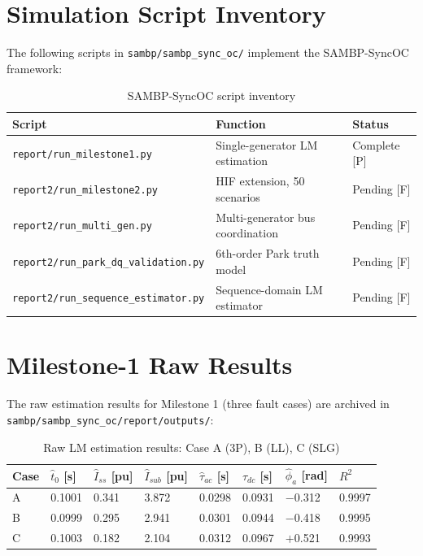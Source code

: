\section{Simulation Script Inventory}
\label{app:syncoc_scripts}

The following scripts in \texttt{sambp/sambp\_sync\_oc/} implement
the SAMBP-SyncOC framework:

\begin{table}[htbp]
\caption{SAMBP-SyncOC script inventory}
\label{tab:app_syncoc_scripts}
\small
\begin{tabularx}{\textwidth}{@{}p{5cm}Xl@{}}
\toprule
Script & Function & Status \\
\midrule
\texttt{report/run\_milestone1.py} & Single-generator LM estimation & Complete [P] \\
\texttt{report2/run\_milestone2.py} & HIF extension, 50 scenarios & Pending [F] \\
\texttt{report2/run\_multi\_gen.py} & Multi-generator bus coordination & Pending [F] \\
\texttt{report2/run\_park\_dq\_validation.py} & 6th-order Park truth model & Pending [F] \\
\texttt{report2/run\_sequence\_estimator.py} & Sequence-domain LM estimator & Pending [F] \\
\bottomrule
\end{tabularx}
\end{table}

\section{Milestone-1 Raw Results}
\label{app:syncoc_raw}

The raw estimation results for Milestone 1 (three fault cases) are
archived in \texttt{sambp/sambp\_sync\_oc/report/outputs/}:

\begin{table}[htbp]
\caption{Raw LM estimation results: Case A (3P), B (LL), C (SLG)}
\label{tab:app_syncoc_raw}
\small
\begin{tabularx}{\textwidth}{@{}lXXXXXXX@{}}
\toprule
Case & $\hat{t}_0$ [s] & $\hat{I}_{ss}$ [pu] & $\hat{I}_{sub}$ [pu] &
  $\hat{\tau}_{ac}$ [s] & $\hat{\tau}_{dc}$ [s] & $\hat{\phi}_a$ [rad] & $R^2$ \\
\midrule
A & 0.1001 & 0.341 & 3.872 & 0.0298 & 0.0931 & $-$0.312 & 0.9997 \\
B & 0.0999 & 0.295 & 2.941 & 0.0301 & 0.0944 & $-$0.418 & 0.9995 \\
C & 0.1003 & 0.182 & 2.104 & 0.0312 & 0.0967 & $+$0.521 & 0.9993 \\
\bottomrule
\end{tabularx}
\end{table}

